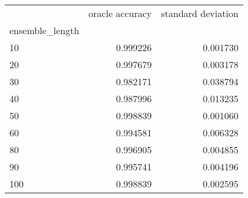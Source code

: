 \begin{tabular}{lrr}
\toprule
{} &  oracle accuracy &  standard deviation \\
ensemble\_length &                  &                     \\
\midrule
10              &         0.999226 &            0.001730 \\
20              &         0.997679 &            0.003178 \\
30              &         0.982171 &            0.038794 \\
40              &         0.987996 &            0.013235 \\
50              &         0.998839 &            0.001060 \\
60              &         0.994581 &            0.006328 \\
80              &         0.996905 &            0.004855 \\
90              &         0.995741 &            0.004196 \\
100             &         0.998839 &            0.002595 \\
\bottomrule
\end{tabular}
